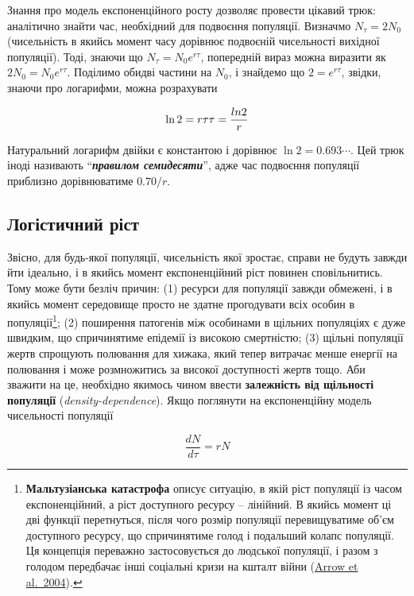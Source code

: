 \documentclass[
  11pt,
]{book}
\begin{document}
Знання про модель експоненційного росту дозволяє провести цікавий трюк: аналітично знайти час, необхідний для подвоєння популяції. Визначмо \(N_\tau = 2N_0\) (чисельність в якийсь момент часу дорівнює подвоєній чисельності вихідної популяції). Тоді, знаючи що \(N_\tau = N_0 e^{r\tau}\), попередній вираз можна виразити як \(2N_0 = N_0 e^{r\tau}\). Поділимо обидві частини на \(N_0\), і знайдемо що \(2 = e^{r\tau}\), звідки, знаючи про логарифми, можна розрахувати

\[
\ln2 = r\tau \\
\tau = \frac{ln2}{r}
\]

Натуральний логарифм двійки є константою і дорівнює \(\ln2 = 0.693\cdots\). Цей трюк іноді називають ``\textbf{\emph{правилом семидесяти}}'', адже час подвоєння популяції приблизно дорівнюватиме \(0.70/r\).

\subsection{Логістичний ріст}\label{ux43bux43eux433ux456ux441ux442ux438ux447ux43dux438ux439-ux440ux456ux441ux442}

Звісно, для будь-якої популяції, чисельність якої зростає, справи не будуть завжди йти ідеально, і в якийсь момент експоненційний ріст повинен сповільнитись. Тому може бути безліч причин: (1) ресурси для популяції завжди обмежені, і в якийсь момент середовище просто не здатне прогодувати всіх особин в популяції\footnote{\textbf{Мальтузіанська катастрофа} описує ситуацію, в якій ріст популяції із часом експоненційний, а ріст доступного ресурсу -- лінійний. В якийсь момент ці дві функції перетнуться, після чого розмір популяції перевищуватиме об'єм доступного ресурсу, що спричинятиме голод і подальший колапс популяції. Ця концепція переважно застосовується до людської популяції, і разом з голодом передбачає інші соціальні кризи на кшталт війни (\href{https://doi.org/10.1257/0895330042162377}{Arrow et al.~2004}).}; (2) поширення патогенів між особинами в щільних популяціях є дуже швидким, що спричинятиме епідемії із високою смертністю; (3) щільні популяції жертв спрощують полювання для хижака, який тепер витрачає менше енергії на полювання і може розмножитись за високої доступності жертв тощо. Аби зважити на це, необхідно якимось чином ввести \textbf{залежність від щільності популяції} (\emph{density-dependence}). Якщо поглянути на експоненційну модель чисельності популяції

\[\frac{dN}{d\tau} = rN\]
\end{document}
